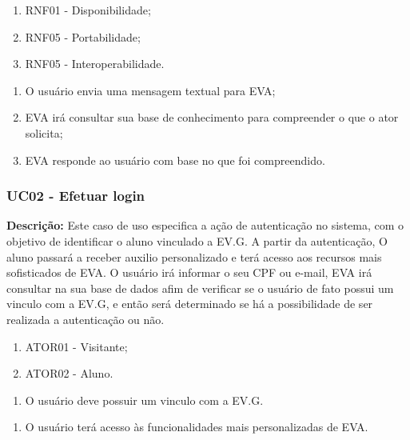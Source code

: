 \begin{enumerate}[label=\alph*)]
    \tightlist
    \item RNF01 - Disponibilidade;
    \item RNF05 - Portabilidade;
    \item RNF05 - Interoperabilidade.
\end{enumerate}
        
\begin{enumerate}[label=\alph*)]
    \tightlist
    \item O usuário envia uma mensagem textual para EVA;
    \item EVA irá consultar sua base de conhecimento para compreender o que o ator solicita;
    \item EVA responde ao usuário com base no que foi compreendido.
\end{enumerate}

\subsubsection{UC02 - Efetuar login}

\textbf{Descrição:} Este caso de uso especifica a ação de autenticação no sistema, com o objetivo de identificar o aluno vinculado a EV.G. A partir da autenticação, O aluno passará a receber auxilio personalizado e terá acesso aos recursos mais sofisticados de EVA. O usuário irá informar o seu CPF ou e-mail, EVA irá consultar na sua base de dados afim de verificar se o usuário de fato possui um vinculo com a EV.G, e então será determinado se há a possibilidade de ser realizada a autenticação ou não.


\begin{enumerate}[label=\alph*)]
    \tightlist
    \item ATOR01 - Visitante;
    \item ATOR02 - Aluno.
\end{enumerate}
        
\begin{enumerate}[label=\alph*)]
    \tightlist
    \item O usuário deve possuir um vinculo com a EV.G.
\end{enumerate}
        
\begin{enumerate}[label=\alph*)]
    \tightlist
    \item O usuário terá acesso às funcionalidades mais personalizadas de EVA.
\end{enumerate}
        
